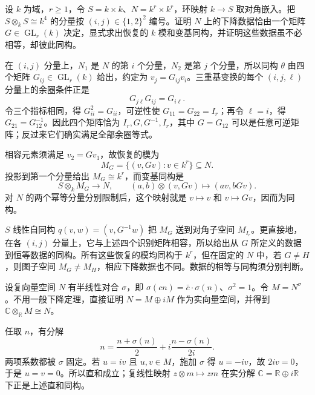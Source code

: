 \begin{optionalexercise}\label{b3:ex:12-module-without-descent}
	设 \(k\) 为域，\(r\ge1\)，令 \(S=k\times k\)、\(N=k^r\times k^r\)，环映射 \(k\to S\) 取对角嵌入。把 \(S\otimes_kS\cong k^4\) 的分量按 \((i,j)\in\{1,2\}^2\) 编号。证明 \(N\) 上的下降数据恰由一个矩阵 \(G\in\operatorname{GL}_r(k)\) 决定，显式求出恢复的 \(k\) 模和变基同构，并证明这些数据虽不必相等，却彼此同构。
\end{optionalexercise}
\begin{solution}
	在 \((i,j)\) 分量上，\(N_1\) 是 \(N\) 的第 \(i\) 个分量，\(N_2\) 是第 \(j\) 个分量，所以同构 \(\theta\) 由四个矩阵 \(G_{ij}\in\operatorname{GL}_r(k)\) 给出，约定为 \(v_j=G_{ij}v_i\)。三重基变换的每个 \((i,j,\ell)\) 分量上的余圈条件正是
	\[
		G_{j\ell}G_{ij}=G_{i\ell}.
	\]
	令三个指标相同，得 \(G_{ii}^2=G_{ii}\)，可逆性使 \(G_{11}=G_{22}=I_r\)；再令 \(\ell=i\)，得 \(G_{21}=G_{12}^{-1}\)。因此四个矩阵恰为 \(I_r,G,G^{-1},I_r\)，其中 \(G=G_{12}\) 可以是任意可逆矩阵；反过来它们确实满足全部余圈等式。

	相容元素须满足 \(v_2=Gv_1\)，故恢复的模为
	\[
		M_G=\{(v,Gv):v\in k^r\}\subseteq N.
	\]
	投影到第一个分量给出 \(M_G\cong k^r\)，而变基同构是
	\[
		S\otimes_kM_G\longrightarrow N, \qquad (a,b)\otimes(v,Gv)\longmapsto(av,bGv).
	\]
	对 \(N\) 的两个幂等分量分别限制后，这个映射就是 \(v\mapsto v\) 和 \(v\mapsto Gv\)，因而为同构。

	\(S\) 线性自同构 \(q(v,w)=(v,G^{-1}w)\) 把 \(M_G\) 送到对角子空间 \(M_{I_r}\)。更直接地，在各 \((i,j)\) 分量上，它与上述四个识别矩阵相容，所以给出从 \(G\) 所定义的数据到恒等数据的同构。所有这些恢复的模均同构于 \(k^r\)，但在固定的 \(N\) 中，若 \(G\ne H\)，则图子空间 \(M_G\ne M_H\)，相应下降数据也不同。数据的相等与同构须分别判断。
\end{solution}

\begin{optionalexercise}\label{b3:ex:12-real-semilinear}
	设复向量空间 \(N\) 有半线性对合 \(\sigma\)，即 \(\sigma(cn)=\bar c\cdot\sigma(n)\)、\(\sigma^2=1\)。令 \(M=N^\sigma\)。不用一般下降定理，直接证明 \(N=M\oplus iM\) 作为实向量空间，并得到 \(\mathbb C\otimes_{\mathbb R}M\cong N\)。
\end{optionalexercise}
\begin{solution}
	任取 \(n\)，有分解
	\[
		n=\dfrac{n+\sigma(n)}2+i\dfrac{n-\sigma(n)}{2i}.
	\]
	两项系数都被 \(\sigma\) 固定。若 \(u=iv\) 且 \(u,v\in M\)，施加 \(\sigma\) 得 \(u=-iv\)，故 \(2iv=0\)，于是 \(u=v=0\)。所以直和成立；复线性映射 \(z\otimes m\mapsto zm\) 在实分解 \(\mathbb C=\mathbb R\oplus i\mathbb R\) 下正是上述直和同构。
\end{solution}

